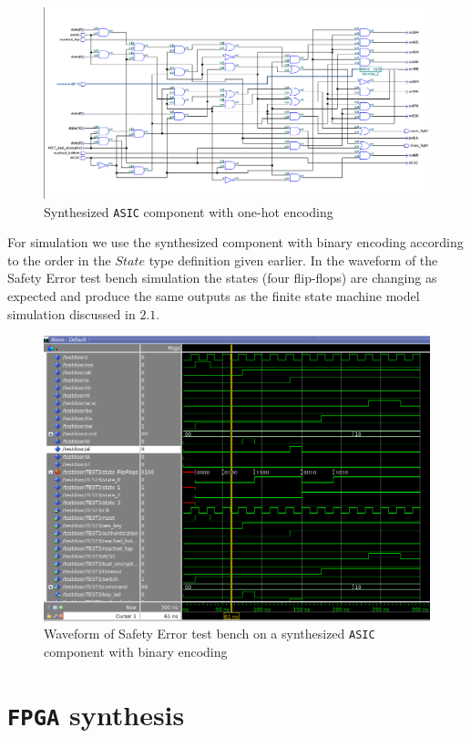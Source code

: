 \documentclass[a4paper,11pt]{article}
\begin{document}
	\begin{figure}[H]
	    \centering
	    \includegraphics[width=0.8\linewidth]{OneHotASIC.png}
	    \caption{Synthesized \texttt{ASIC} component with one-hot encoding}
	\end{figure}
	
	\par For simulation we use the synthesized component with binary encoding according to the order in the $State$ type definition given earlier. In the waveform of the Safety Error test bench simulation the states (four flip-flops) are changing as expected and produce the same outputs as the finite state machine model simulation discussed in $2.1$.
	\begin{figure}[H]
	    \centering
	    \includegraphics[width=1\linewidth]{Synthesized.png}
	    \caption{Waveform of Safety Error test bench on a synthesized \texttt{ASIC} component with binary encoding}
	\end{figure}

	\section{\texttt{FPGA} synthesis}
	
\end{document}
